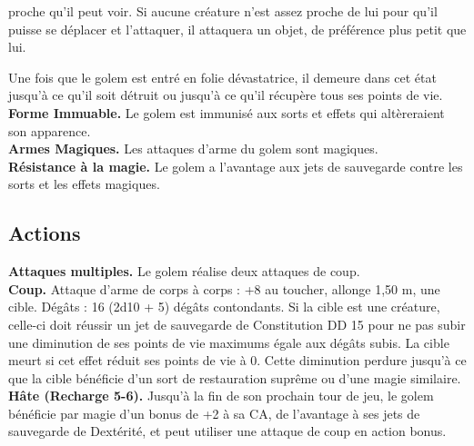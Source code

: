 \begin{figure*}[hbp]
{\begin{minipage}[c]{.45\linewidth}
               proche qu'il peut voir. Si aucune créature n'est assez proche de lui pour qu'il puisse se 
               déplacer et l'attaquer, il attaquera un objet, de préférence plus petit que lui.
  \end{minipage}
  \hspace{4pt}
  \begin{minipage}[c]{.45\linewidth}
               Une fois 
               que le golem est entré en folie dévastatrice, il demeure dans cet état jusqu'à ce qu'il soit 
               détruit ou jusqu'à ce qu'il récupère tous ses points de vie. \\
    {\bfseries Forme Immuable.} Le golem est immunisé aux sorts et effets qui altèreraient son apparence. \\
    {\bfseries Armes Magiques.} Les attaques d'arme du golem sont magiques. \\
    {\bfseries Résistance à la magie.} Le golem a l'avantage aux jets de sauvegarde contre les sorts et les 
               effets magiques.
\vspace{-10pt}
    \subsection*{Actions}
    {\bfseries Attaques multiples.} Le golem réalise deux attaques de coup.\\
    {\bfseries Coup.} Attaque d'arme de corps à corps : +8 au toucher, allonge 1,50 m, une cible. 
               Dégâts : 16 (2d10 + 5) dégâts contondants. Si la cible est une créature, celle-ci doit 
               réussir un jet de sauvegarde de Constitution DD 15 pour ne pas subir une diminution de ses 
               points de vie maximums égale aux dégâts subis. La cible meurt si cet effet réduit ses points 
               de vie à 0. Cette diminution perdure jusqu'à ce que la cible bénéficie d'un sort de 
               restauration suprême ou d'une magie similaire. \\
    {\bfseries Hâte (Recharge 5-6).} Jusqu'à la fin de son prochain tour de jeu, le golem bénéficie par 
               magie d'un bonus de +2 à sa CA, de l'avantage à ses jets de sauvegarde de Dextérité, et peut 
               utiliser une attaque de coup en action bonus.
  \end{minipage}
}%
\end{figure*}

